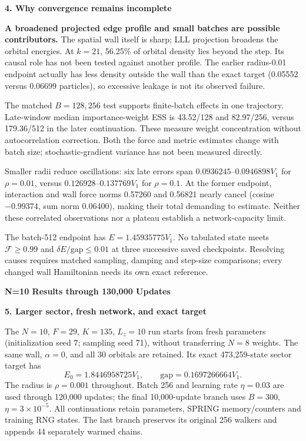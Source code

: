 \documentclass[10pt,letterpaper]{article}
\newcommand{\topic}[1]{\vspace{3pt}\textbf{\color{ink}#1}\par}
\newcommand{\fid}{\mathcal F}
\newcommand{\de}{\delta E}
\newcommand{\V}{V_1}
\begin{document}
\topic{4. Why convergence remains incomplete}
\textbf{A broadened projected edge profile and small batches are possible contributors.} The spatial wall itself is sharp; LLL projection broadens the orbital energies. At $k=21$, 56.25\% of orbital density lies beyond the step. Its causal role has not been tested against another profile. The earlier radius-0.01 endpoint actually has less density outside the wall than the exact target (0.05552 versus 0.06699 particles), so excessive leakage is not its observed failure.

The matched $B=128,256$ test supports finite-batch effects in one trajectory. Late-window median importance-weight ESS is 43.52/128 and 82.97/256, versus 179.36/512 in the later continuation. These measure weight concentration without autocorrelation correction. Both the force and metric estimates change with batch size; stochastic-gradient variance has not been measured directly.

Smaller radii reduce oscillations: six late errors span $0.0936245$--$0.0946898\V$ for $\rho=0.01$, versus $0.126928$--$0.137769\V$ for $\rho=0.1$. At the former endpoint, interaction and wall force norms 0.57260 and 0.56821 nearly cancel (cosine $-0.99374$, sum norm 0.06400), making their total demanding to estimate. Neither these correlated observations nor a plateau establish a network-capacity limit.

The batch-512 endpoint has $E=1.45935775\V$. No tabulated state meets $\fid\ge0.99$ and $\de/\mathrm{gap}\le0.01$ at three successive saved checkpoints. Resolving causes requires matched sampling, damping and step-size comparisons; every changed wall Hamiltonian needs its own exact reference.

\clearpage
\begin{center}{\Large\bfseries N=10 Results through 130,000 Updates}\end{center}

\topic{5. Larger sector, fresh network, and exact target}
The $N=10$, $F=29$, $K=135$, $L_z=10$ run starts from fresh parameters (initialization seed 7; sampling seed 71), without transferring $N=8$ weights. The same wall, $\alpha=0$, and all 30 orbitals are retained. Its exact 473,259-state sector target has
\[
E_0=1.8446958725\V,\qquad \mathrm{gap}=0.1697266664\V.
\]
The radius is $\rho=0.001$ throughout. Batch 256 and learning rate $\eta=0.03$ are used through 120,000 updates; the final 10,000-update branch uses $B=300$, $\eta=3\times10^{-5}$. All continuations retain parameters, SPRING memory/counters and training RNG states. The last branch preserves its original 256 walkers and appends 44 separately warmed chains.
\end{document}
